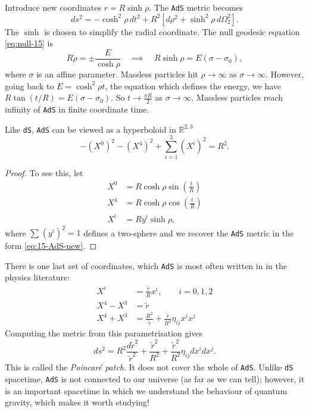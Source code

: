 Introduce new coordinates $r = R\sinh \rho$. The \texttt{AdS} metric becomes
\begin{equation}
  \label{eq:15-AdS-new}
  ds^2 = -\cosh^2\rho \, dt^2 + R^2 \left[ d\rho^2 + \sinh^2\rho \, d\Omega_2^2 \right].
\end{equation}
The $\sinh$ is chosen to simplify the radial coordinate.
The null geodesic equation \eqref{eq:null-15} is
\begin{equation}
  R \dot{\rho} = \pm \frac{E}{\cosh\rho} \quad\implies\quad R \sinh\rho = E (\sigma - \sigma_0),
\end{equation}
where $\sigma$ is an affine parameter.
Massless particles hit $\rho \to \infty$ as $\sigma \to \infty$.
However, going back to $E = \cosh^2\rho \dot{t}$, the equation which defines the energy, we have $R \tan(t/R) = E (\sigma - \sigma_0)$.
So $t \to \frac{\pi R}{2}$ as $\sigma \to \infty$. Massless particles reach infinity of \texttt{AdS} in finite coordinate time.
\begin{claim}
  Like \texttt{dS}, \texttt{AdS} can be viewed as a hyperboloid in $\mathbb{R}^{2, 3}$
  \begin{equation}
    -(X^0)^2 - (X^4)^2 + \sum_{i=1}^{3}(X^{i})^2 = R^2.
  \end{equation}
\end{claim}
\begin{proof}
  To see this, let
  \begin{subequations}
    \begin{align}
      X^0 &= R \cosh \rho \sin(\frac{t}{R}) \\
      X^4 &= R \cosh \rho \cos(\frac{t}{R}) \\
      X^{i} &= R y^{i} \sinh\rho,
    \end{align}
  \end{subequations}
  where $\sum_{}^{} (y^{i})^2 = 1$ defines a two-sphere and we recover the \texttt{AdS} metric in the form \eqref{eq:15-AdS-new}. 
\end{proof}
There is one last set of coordinates, which \texttt{AdS} is most often written in in the physics literature:
\begin{subequations}
  \begin{align}
    X^{i} &= \frac{\widetilde{r}}{R} x^{i}, \qquad i = 0,1,2   \\
    X^4 - X^3 &= \widetilde{r} \\
    X^4 + X^3 &= \frac{R^2}{\widetilde{r}} + \frac{\widetilde{r}}{R^2} \eta_{ij} x^{i} x^{j}
  \end{align}
\end{subequations}
Computing the metric from this parametrisation gives
\begin{equation}
  ds^2 = R^2 \frac{d\widetilde{r}^2}{\widetilde{r}^2} + \frac{\widetilde{r}^2}{R^2} + \frac{\widetilde{r}^2}{R^2} \eta_{ij} dx^{i} dx^{j}.
\end{equation}
This is called the \emph{Poincar\'e patch}. It does not cover the whole of \texttt{AdS}. 
Unlike \texttt{dS} spacetime, \texttt{AdS} is not connected to our universe (as far as we can tell); however, it is an important spacetime in which we understand the behaviour of quantum gravity, which makes it worth studying!
